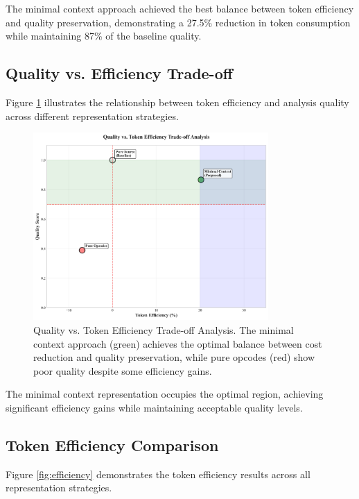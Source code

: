 \documentclass[conference]{IEEEtran}
\begin{document}
The minimal context approach achieved the best balance between token efficiency and quality preservation, demonstrating a 27.5\% reduction in token consumption while maintaining 87\% of the baseline quality.

\subsection{Quality vs. Efficiency Trade-off}

Figure \ref{fig:tradeoff} illustrates the relationship between token efficiency and analysis quality across different representation strategies.

\begin{figure}[htbp]
\centerline{\includegraphics[width=0.8\textwidth]{focused_api_validation_results.png}}
\caption{Quality vs. Token Efficiency Trade-off Analysis. The minimal context approach (green) achieves the optimal balance between cost reduction and quality preservation, while pure opcodes (red) show poor quality despite some efficiency gains.}
\label{fig:tradeoff}
\end{figure}

The minimal context representation occupies the optimal region, achieving significant efficiency gains while maintaining acceptable quality levels.

\subsection{Token Efficiency Comparison}

Figure \ref{fig:efficiency} demonstrates the token efficiency results across all representation strategies.
\end{document}
